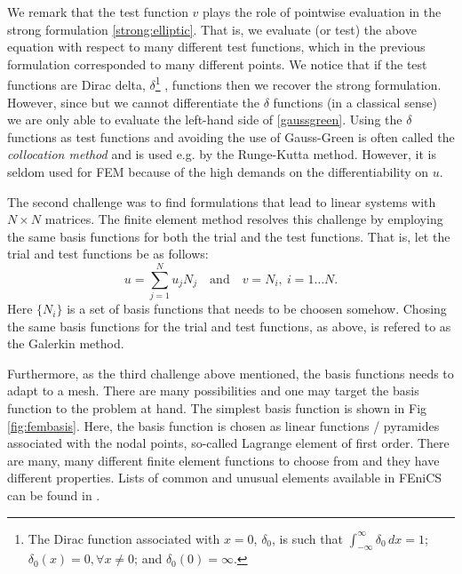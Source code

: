 \begin{remark}
We remark that the test function $v$ plays the role of pointwise evaluation in the strong formulation \eqref{strong:elliptic}. That is,
we evaluate (or test) the above equation with respect to many different test functions, which in the previous formulation corresponded to many different points. 
	We notice that if the test functions are Dirac delta, $\delta$\footnote{The Dirac function associated with $x=0$,  $\delta_0$, is such that $\int_{-\infty}^\infty \delta_0 \, dx = 1$; $\delta_0(x)=0, \forall x \ne 0$; and $ \delta_0(0) = \infty$. }   ,  functions then we recover the  strong formulation. However, since but we cannot differentiate the $\delta$ 
functions (in a classical sense) we are only able to evaluate the left-hand side of \eqref{gaussgreen}.  Using the $\delta$ functions as test functions
and avoiding the use of Gauss-Green is often called
the \emph{collocation method} and is used e.g. by the Runge-Kutta method. However, it is 
seldom used for FEM because of the high demands on the differentiability on $u$. 
\end{remark}


The second challenge was to find formulations that lead to linear systems with $N\times N$ matrices. 
The finite element method resolves
this challenge by employing the same basis functions for both the trial and the test functions. 
That is, let 
the trial and test functions be as follows:  
\begin{equation}
\label{trialtest}
	u = \sum_{j=1}^N u_j N_j \quad \text{and} \quad v=N_i, \ i=1\ldots N. 
\end{equation}
Here $\{N_i\}$ is a set of basis functions that needs to be choosen somehow. 
Chosing the same basis functions for the trial and test functions, as above, is refered to as the Galerkin method. 

Furthermore, as the third challenge above mentioned, the 
basis functions needs to adapt to a mesh. 
There are many possibilities and one may target the basis function to the problem at hand. 
The simplest basis function is shown in 
Fig \ref{fig:fembasis}. Here, the basis function is chosen as linear functions / pyramides associated with the nodal points, 
so-called Lagrange element of first order.  
There are many, many different finite element functions to choose from and they have different properties. 
Lists of common and unusual elements available in FEniCS can be found in 
\cite{logg2012automated}. 

